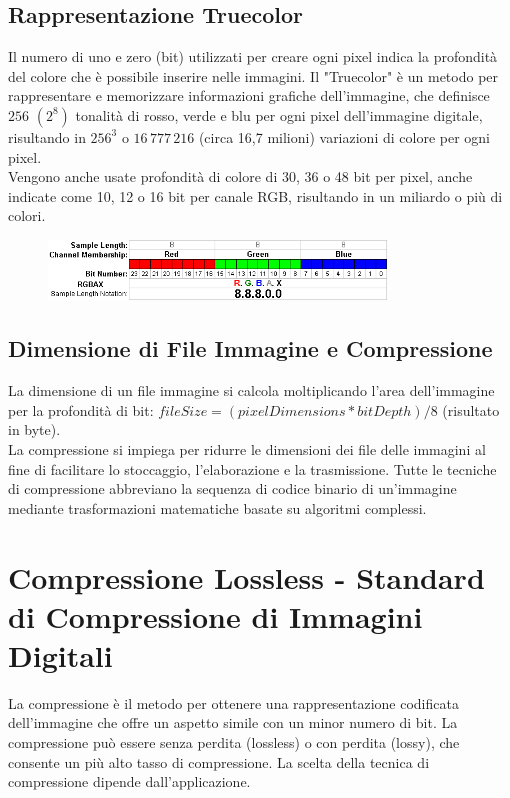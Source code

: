 \documentclass[a4paper,11pt]{article} %
\begin{document}
\subsection{Rappresentazione Truecolor}
Il numero di uno e zero (bit) utilizzati per creare ogni pixel indica la profondità del colore che è possibile inserire nelle immagini. Il "Truecolor" è un metodo per rappresentare e memorizzare informazioni grafiche dell'immagine, che definisce $256$ $(2^8)$ tonalità di rosso, verde e blu per ogni pixel dell'immagine digitale, risultando in $256^3$ o $16 \, 777 \, 216$ (circa 16,7 milioni) variazioni di colore per ogni pixel.\\
Vengono anche usate profondità di colore di 30, 36 o 48 bit per pixel, anche indicate come 10, 12 o 16 bit per canale RGB, risultando in un miliardo o più di colori.
\begin{figure}[h]
    \centering
    \includegraphics[width=0.8\textwidth]{RGBbit}
\end{figure}

\subsection{Dimensione di File Immagine e Compressione}
La dimensione di un file immagine si calcola moltiplicando l'area dell'immagine per la profondità di bit: \quad $file Size=(pixelDimensions *bitDepth)/8$ (risultato in byte).\\
La compressione si impiega per ridurre le dimensioni dei file delle immagini al fine di facilitare lo stoccaggio, l'elaborazione e la trasmissione. Tutte le tecniche di compressione abbreviano la sequenza di codice binario di un'immagine mediante trasformazioni matematiche basate su algoritmi complessi.

\newpage
\section{Compressione Lossless - Standard di Compressione di Immagini Digitali}

La compressione è il metodo per ottenere una rappresentazione codificata dell'immagine che offre un aspetto simile con un minor numero di bit. La compressione può essere senza perdita (lossless) o con perdita (lossy), che consente un più alto tasso di compressione. La scelta della tecnica di compressione dipende dall'applicazione.
\end{document}
